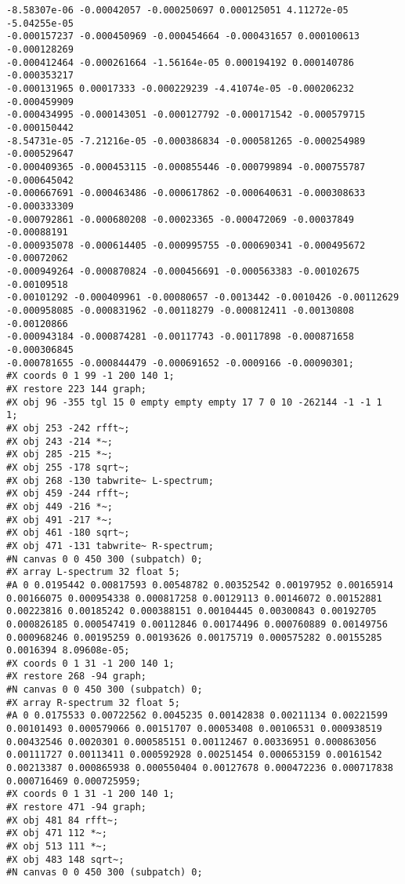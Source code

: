 \begin{itemize}
\begin{verbatim}
-8.58307e-06 -0.00042057 -0.000250697 0.000125051 4.11272e-05 -5.04255e-05
-0.000157237 -0.000450969 -0.000454664 -0.000431657 0.000100613 -0.000128269
-0.000412464 -0.000261664 -1.56164e-05 0.000194192 0.000140786 -0.000353217
-0.000131965 0.00017333 -0.000229239 -4.41074e-05 -0.000206232 -0.000459909
-0.000434995 -0.000143051 -0.000127792 -0.000171542 -0.000579715 -0.000150442
-8.54731e-05 -7.21216e-05 -0.000386834 -0.000581265 -0.000254989 -0.000529647
-0.000409365 -0.000453115 -0.000855446 -0.000799894 -0.000755787 -0.000645042
-0.000667691 -0.000463486 -0.000617862 -0.000640631 -0.000308633 -0.000333309
-0.000792861 -0.000680208 -0.00023365 -0.000472069 -0.00037849 -0.00088191
-0.000935078 -0.000614405 -0.000995755 -0.000690341 -0.000495672 -0.00072062
-0.000949264 -0.000870824 -0.000456691 -0.000563383 -0.00102675 -0.00109518
-0.00101292 -0.000409961 -0.00080657 -0.0013442 -0.0010426 -0.00112629
-0.000958085 -0.000831962 -0.00118279 -0.000812411 -0.00130808 -0.00120866
-0.000943184 -0.000874281 -0.00117743 -0.00117898 -0.000871658 -0.000306845
-0.000781655 -0.000844479 -0.000691652 -0.0009166 -0.00090301;
#X coords 0 1 99 -1 200 140 1;
#X restore 223 144 graph;
#X obj 96 -355 tgl 15 0 empty empty empty 17 7 0 10 -262144 -1 -1 1
1;
#X obj 253 -242 rfft~;
#X obj 243 -214 *~;
#X obj 285 -215 *~;
#X obj 255 -178 sqrt~;
#X obj 268 -130 tabwrite~ L-spectrum;
#X obj 459 -244 rfft~;
#X obj 449 -216 *~;
#X obj 491 -217 *~;
#X obj 461 -180 sqrt~;
#X obj 471 -131 tabwrite~ R-spectrum;
#N canvas 0 0 450 300 (subpatch) 0;
#X array L-spectrum 32 float 5;
#A 0 0.0195442 0.00817593 0.00548782 0.00352542 0.00197952 0.00165914
0.00166075 0.000954338 0.000817258 0.00129113 0.00146072 0.00152881
0.00223816 0.00185242 0.000388151 0.00104445 0.00300843 0.00192705
0.000826185 0.000547419 0.00112846 0.00174496 0.000760889 0.00149756
0.000968246 0.00195259 0.00193626 0.00175719 0.000575282 0.00155285
0.0016394 8.09608e-05;
#X coords 0 1 31 -1 200 140 1;
#X restore 268 -94 graph;
#N canvas 0 0 450 300 (subpatch) 0;
#X array R-spectrum 32 float 5;
#A 0 0.0175533 0.00722562 0.0045235 0.00142838 0.00211134 0.00221599
0.00101493 0.000579066 0.00151707 0.00053408 0.00106531 0.000938519
0.00432546 0.0020301 0.000585151 0.00112467 0.00336951 0.000863056
0.00111727 0.00113411 0.000592928 0.00251454 0.000653159 0.00161542
0.00213387 0.000865938 0.000550404 0.00127678 0.000472236 0.000717838
0.000716469 0.000725959;
#X coords 0 1 31 -1 200 140 1;
#X restore 471 -94 graph;
#X obj 481 84 rfft~;
#X obj 471 112 *~;
#X obj 513 111 *~;
#X obj 483 148 sqrt~;
#N canvas 0 0 450 300 (subpatch) 0;

\end{verbatim}
\end{itemize}
